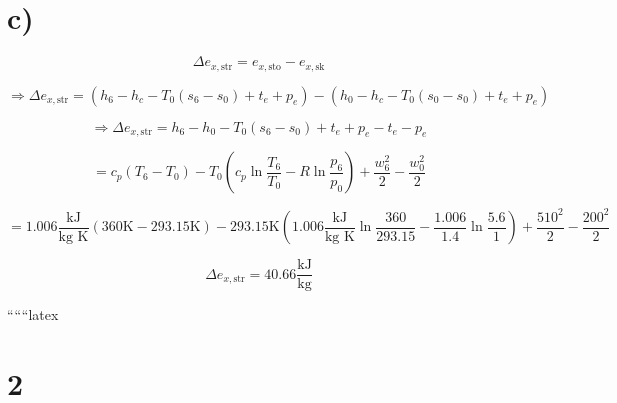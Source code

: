

\section*{c)}

\[
\Delta e_{x, \text{str}} = e_{x, \text{sto}} - e_{x, \text{sk}}
\]

\[
\Rightarrow \Delta e_{x, \text{str}} = \left( h_6 - h_c - T_0 (s_6 - s_0) + t_e + p_e \right) - \left( h_0 - h_c - T_0 (s_0 - s_0) + t_e + p_e \right)
\]

\[
\Rightarrow \Delta e_{x, \text{str}} = h_6 - h_0 - T_0 (s_6 - s_0) + t_e + p_e - t_e - p_e
\]

\[
= c_p (T_6 - T_0) - T_0 \left( c_p \ln \frac{T_6}{T_0} - R \ln \frac{p_6}{p_0} \right) + \frac{w_6^2}{2} - \frac{w_0^2}{2}
\]

\[
= 1.006 \frac{\text{kJ}}{\text{kg K}} \left( 360 \text{K} - 293.15 \text{K} \right) - 293.15 \text{K} \left( 1.006 \frac{\text{kJ}}{\text{kg K}} \ln \frac{360}{293.15} - \frac{1.006}{1.4} \ln \frac{5.6}{1} \right) + \frac{510^2}{2} - \frac{200^2}{2}
\]

\[
\Delta e_{x, \text{str}} = \boxed{40.66 \frac{\text{kJ}}{\text{kg}}}
\]

``````latex


\section*{2}